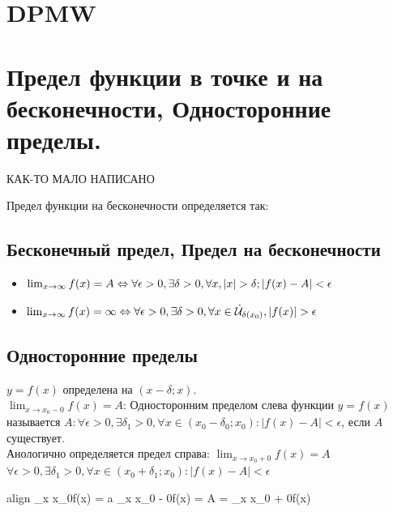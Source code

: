 \documentclass[oneside]{book}
\newcommand{\boxedeq}[2]{\begin{empheq}[box={\fboxsep=6pt\fbox}]{align}\label{#1}#2\end{empheq}}
\begin{document}
\begin{enumerate}
\chapter{DPMW}
\pagebreak

\chapter{Предел функции в точке и на бесконечности, Односторонние пределы.\\}

{\LARGE КАК-ТО МАЛО НАПИСАНО}

Предел функции на бесконечности определяется так:
\section{Бесконечный предел, Предел на бесконечности}
\begin{itemize}
    \item $\lim_{x \rightarrow \infty}{f(x)} = A \Leftrightarrow \\ \forall \epsilon > 0, \exists \delta > 0,
           \forall x, |x| > \delta; |f(x) - A| < \epsilon$
    \item $\lim_{x \rightarrow \infty}{f(x)} = \infty \Leftrightarrow \\ \forall \epsilon > 0, \exists \delta > 0,
           \forall x \in \dot{\mathcal{U}}_{\delta(x_0)}, |f(x)| > \epsilon$
\end{itemize}

\section{Односторонние пределы}
$y = f(x)$ определена на $(x-\delta; x)$. \\
$\lim_{x \rightarrow x_0 - 0}{f(x)} = A$: Односторонним пределом слева функции $y = f(x)$ называется $A:
\forall \epsilon > 0, \exists \delta_1 > 0, \forall x \in (x_0-\delta_0; x_0): |f(x)-A|<\epsilon$, если $A$ существует. \\
Анологично определяется предел справа: $\lim_{x \rightarrow x_0 + 0}{f(x)} = A$ $\forall \epsilon > 0, \exists \delta_1 > 0,
\forall x \in (x_0+\delta_1; x_0): |f(x)-A|<\epsilon$

\boxedeq{eq:*}{
    \lim_{x \rightarrow x_0}{f(x) = a} \Leftrightarrow \lim_{x \rightarrow x_0 - 0}{f(x)} = A = \lim_{x \rightarrow x_0 + 0}{f(x)}
}


\end{enumerate}
\end{document}
